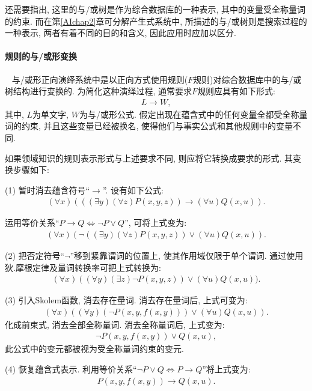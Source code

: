 还需要指出, 这里的与/或树是作为综合数据库的一种表示, 其中的变量受全称量词的约束. 而在第\ref{AIchap2}章可分解产生式系统中, 所描述的与/或树则是搜索过程的一种表示, 两者有着不同的目的和含义, 因此应用时应加以区分.
\paragraph{规则的与/或形变换}~{}
与/或形正向演绎系统中是以正向方式使用规则($F$规则)对综合数据库中的与/或树结构进行变换的. 为简化这种演绎过程, 通常要求$F$规则应具有如下形式:
\begin{align}
  L\rightarrow W,
\end{align}
其中, $L$为单文字, $W$为与/或形公式. 假定出现在蕴含式中的任何变量全都受全称量词的约束, 并且这些变量已经被换名, 使得他们与事实公式和其他规则中的变量不同.

如果领域知识的规则表示形式与上述要求不同, 则应将它转换成要求的形式. 其变换步骤如下:

(1) 暂时消去蕴含符号“$\rightarrow$”. 设有如下公式:
\begin{align}
  (\forall x)(((\exists  y) (\forall  z)P(x, y,z))\rightarrow (\forall u)Q(x, u)).
\end{align}

运用等价关系“$P\rightarrow Q\Leftrightarrow \neg P\vee Q$”, 可将上式变为:
\begin{align}
  (\forall x)(\neg ((\exists   y) (\forall z)P(x, y,z))\vee (\forall u)Q(x, u)).
\end{align}

(2) 把否定符号“$\neg$”移到紧靠谓词的位置上, 使其作用域仅限于单个谓词. 通过使用狄.摩根定律及量词转换率可把上式转换为:
\begin{align}
  (\forall  x)( (\forall y) (\exists  z)\neg P(x, y,z))\vee  (\forall u)Q(x, u)).
\end{align}

(3) 引入Skolem函数, 消去存在量词. 消去存在量词后, 上式可变为:
\begin{align}
  (\forall  x)( (\forall y) (\neg P(x, y,f(x,y)))\vee (\forall u)Q(x, u)).
\end{align}
化成前束式, 消去全部全称量词. 消去全称量词后, 上式变为:
\begin{align}
  \neg P(x, y,f(x,y))\vee Q(x, u),
\end{align}
此公式中的变元都被视为受全称量词约束的变元.

(4) 恢复蕴含式表示. 利用等价关系“$\neg P\vee Q\Leftrightarrow P\rightarrow Q$”将上式变为:
\begin{align}
   P(x, y,f(x,y))\rightarrow Q(x, u).
\end{align}

